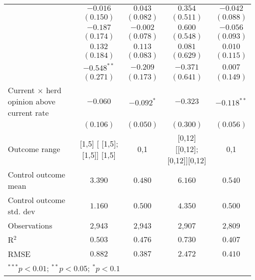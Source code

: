 \begin{table}
\begin{center}
\begin{tabular}{l c c c c}
                                                 & $-0.016$                     & $0.043$        & $0.354$                       & $-0.042$       \\
                                                 & $(0.150)$                    & $(0.082)$      & $(0.511)$                     & $(0.088)$      \\
                                                 & $-0.187$                     & $-0.002$       & $0.600$                       & $-0.056$       \\
                                                 & $(0.174)$                    & $(0.078)$      & $(0.548)$                     & $(0.093)$      \\
                                                 & $0.132$                      & $0.113$        & $0.081$                       & $0.010$        \\
                                                 & $(0.184)$                    & $(0.083)$      & $(0.629)$                     & $(0.115)$      \\
                                                 & $-0.548^{**}$                & $-0.209$       & $-0.371$                      & $0.007$        \\
                                                 & $(0.271)$                    & $(0.173)$      & $(0.641)$                     & $(0.149)$      \\
Current $\times$ herd opinion above current rate & $-0.060$                     & $-0.092^{*}$   & $-0.323$                      & $-0.118^{**}$  \\
                                                 & $(0.106)$                    & $(0.050)$      & $(0.300)$                     & $(0.056)$      \\
\hline
Outcome range                                    & [1,5] [ [1,5];  [1,5]] [1,5] & {0,1}          & [0,12] [[0,12]; [0,12]][0,12] & {0,1}          \\
Control outcome mean                             & $3.390$                      & $0.480$        & $6.160$                       & $0.540$        \\
Control outcome std. dev                         & $1.160$                      & $0.500$        & $4.350$                       & $0.500$        \\
Observations                                     & 2,943                        & 2,943          & 2,907                         & 2,809          \\
R$^{2}$                                          & $0.503$                      & $0.476$        & $0.730$                       & $0.407$        \\
RMSE                                             & $0.882$                      & $0.387$        & $2.472$                       & $0.410$        \\
\hline
\multicolumn{5}{l}{\scriptsize{$^{***}p<0.01$; $^{**}p<0.05$; $^{*}p<0.1$}}
\end{tabular}
\caption{}
\label{table:SI_table31_currentherdint_joint}
\end{center}
\end{table}
